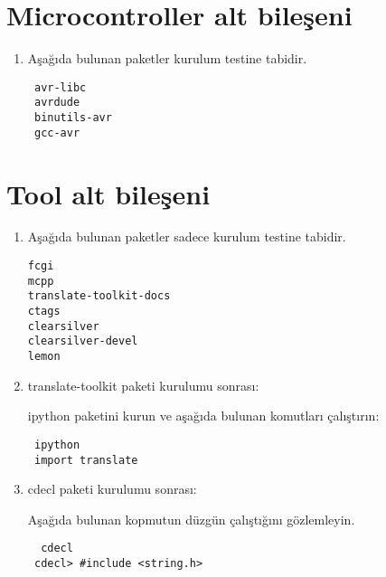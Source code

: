 \documentclass[a4paper,10pt]{article}
\begin{document}
\section{Microcontroller alt bileşeni}
\begin{enumerate}
 \item Aşağıda bulunan paketler kurulum testine tabidir.
\begin{verbatim}
 avr-libc
 avrdude
 binutils-avr
 gcc-avr
\end{verbatim}

\end{enumerate}

\section{Tool alt bileşeni}
\begin{enumerate}
 \item Aşağıda bulunan paketler sadece kurulum testine tabidir.
\begin{verbatim}
fcgi
mcpp
translate-toolkit-docs
ctags
clearsilver
clearsilver-devel
lemon
\end{verbatim}

\item translate-toolkit paketi kurulumu sonrası:

ipython paketini kurun ve aşağıda bulunan komutları çalıştırın:
\begin{verbatim}
 ipython
 import translate
\end{verbatim}

\item cdecl paketi kurulumu sonrası:

Aşağıda bulunan kopmutun düzgün çalıştığını gözlemleyin.
\begin{verbatim}
  cdecl
 cdecl> #include <string.h>
\end{verbatim}

\end{enumerate}
\end{document}
